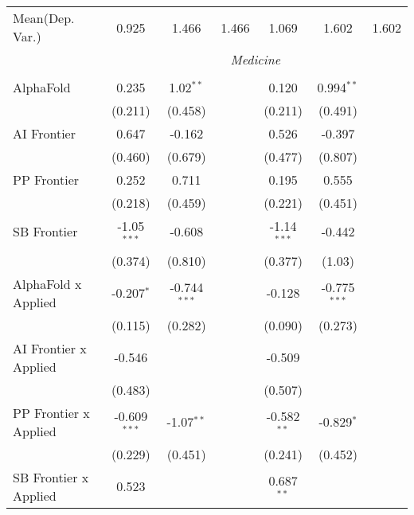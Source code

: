\begin{tabular}{lcccccc}
Mean(Dep. Var.) & 0.925 & 1.466 & 1.466 & 1.069 & 1.602 & 1.602 \\
 & \multicolumn{6}{c}{\textit{Medicine}} \\ \\
   AlphaFold                      & 0.235          & 1.02$^{**}$    &               & 0.120         & 0.994$^{**}$   &   \\   
                                  & (0.211)        & (0.458)        &               & (0.211)       & (0.491)        &   \\   
   AI Frontier                    & 0.647          & -0.162         &               & 0.526         & -0.397         &   \\   
                                  & (0.460)        & (0.679)        &               & (0.477)       & (0.807)        &   \\   
   PP Frontier                    & 0.252          & 0.711          &               & 0.195         & 0.555          &   \\   
                                  & (0.218)        & (0.459)        &               & (0.221)       & (0.451)        &   \\   
   SB Frontier                    & -1.05$^{***}$  & -0.608         &               & -1.14$^{***}$ & -0.442         &   \\   
                                  & (0.374)        & (0.810)        &               & (0.377)       & (1.03)         &   \\   
   AlphaFold x Applied            & -0.207$^{*}$   & -0.744$^{***}$ &               & -0.128        & -0.775$^{***}$ &   \\   
                                  & (0.115)        & (0.282)        &               & (0.090)       & (0.273)        &   \\   
   AI Frontier x Applied          & -0.546         &                &               & -0.509        &                &   \\   
                                  & (0.483)        &                &               & (0.507)       &                &   \\   
   PP Frontier x Applied          & -0.609$^{***}$ & -1.07$^{**}$   &               & -0.582$^{**}$ & -0.829$^{*}$   &   \\   
                                  & (0.229)        & (0.451)        &               & (0.241)       & (0.452)        &   \\   
   SB Frontier x Applied          & 0.523          &                &               & 0.687$^{**}$  &                &   \\   

\end{tabular}
